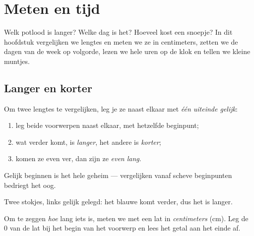 \chapter{Meten en tijd}\label{ch:g1:measure}

Welk potlood is langer? Welke dag is het? Hoeveel kost een snoepje? In
dit hoofdstuk vergelijken we lengtes en meten we ze in centimeters,
zetten we de dagen van de week op volgorde, lezen we hele uren op de
klok en tellen we kleine muntjes.

\section{Langer en korter}

\begin{method}\label{met:g1:measure:compare}
Om twee lengtes te vergelijken, leg je ze naast elkaar met \emph{één
uiteinde gelijk}:
\begin{enumerate}
  \item leg beide voorwerpen naast elkaar, met hetzelfde beginpunt;
  \item wat verder komt, is \emph{langer}, het andere is
        \emph{korter};
  \item komen ze even ver, dan zijn ze \emph{even lang}.
\end{enumerate}
Gelijk beginnen is het hele geheim --- vergelijken vanaf scheve
beginpunten bedriegt het oog.
\end{method}

\begin{omfigure}

{\small Twee stokjes, links gelijk gelegd: het blauwe komt verder, dus
het is langer.}
\end{omfigure}

\begin{definition}[De centimeter]\label{def:g1:measure:cm}
Om te zeggen \emph{hoe} lang iets is, meten we met een lat in
\emph{centimeters} (cm). Leg de $0$ van de lat bij het begin van het
voorwerp en lees het getal aan het einde af.
\end{definition}

